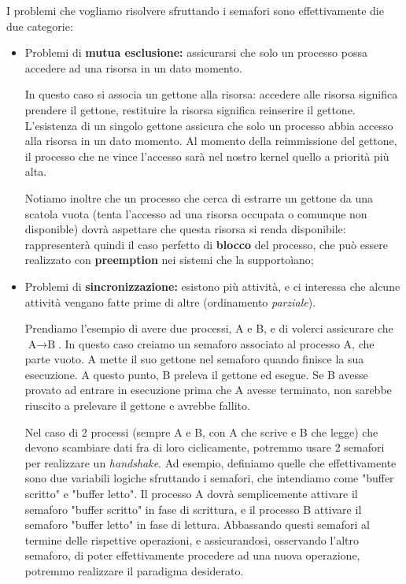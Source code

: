 \documentclass[a4paper,11pt]{article}
\begin{document}
I problemi che vogliamo risolvere sfruttando i semafori sono effettivamente die due categorie:
\begin{itemize}
	\item Problemi di \textbf{mutua esclusione:} assicurarsi che solo un processo possa accedere ad una risorsa in un dato momento.

		In questo caso si associa un gettone alla risorsa: accedere alle risorsa significa prendere il gettone, restituire la risorsa significa reinserire il gettone. L'esistenza di un singolo gettone assicura che solo un processo abbia accesso alla risorsa in un dato momento.
		Al momento della reimmissione del gettone, il processo che ne vince l'accesso sarà nel nostro kernel quello a priorità più alta.

		Notiamo inoltre che un processo che cerca di estrarre un gettone da una scatola vuota (tenta l'accesso ad una risorsa occupata o comunque non disponible) dovrà aspettare che questa risorsa si renda disponibile: rappresenterà quindi il caso perfetto di \textbf{blocco} del processo, che può essere realizzato con \textbf{preemption} nei sistemi che la supportoìano;

	\item Problemi di \textbf{sincronizzazione:} esistono più attività, e ci interessa che alcune attività vengano fatte prime di altre (ordinamento \textit{parziale}).

		Prendiamo l'esempio di avere due processi, A e B, e di volerci assicurare che $\text{A} \rightarrow \text{B}$.
		In questo caso creiamo un semaforo associato al processo A, che parte vuoto. A mette il suo gettone nel semaforo quando finisce la sua esecuzione.
		A questo punto, B preleva il gettone ed esegue.
		Se B avesse provato ad entrare in esecuzione prima che A avesse terminato, non sarebbe riuscito a prelevare il gettone e avrebbe fallito.

		Nel caso di 2 processi (sempre A e B, con A che scrive e B che legge) che devono scambiare dati fra di loro ciclicamente, potremmo usare 2 semafori per realizzare un \textit{handshake}.
		Ad esempio, definiamo quelle che effettivamente sono due variabili logiche sfruttando i semafori, che intendiamo come "buffer scritto" e "buffer letto".
		Il processo A dovrà semplicemente attivare il semaforo "buffer scritto" in fase di scrittura, e il processo B attivare il semaforo "buffer letto" in fase di lettura.
		Abbassando questi semafori al termine delle rispettive operazioni, e assicurandosi, osservando l'altro semaforo, di poter effettivamente procedere ad una nuova operazione, potremmo realizzare il paradigma desiderato. 
\end{itemize}
\end{document}
